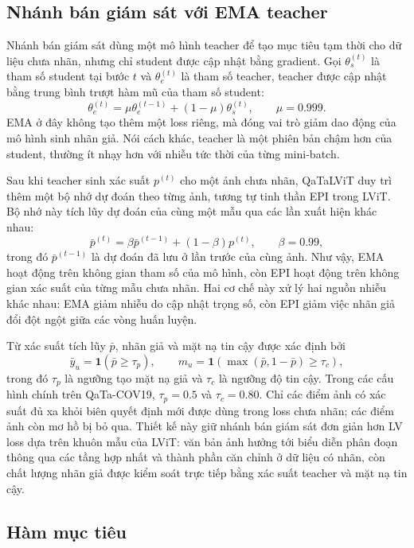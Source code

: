 \subsection{Nhánh bán giám sát với EMA teacher}

Nhánh bán giám sát dùng một mô hình teacher để tạo mục tiêu tạm thời cho dữ liệu chưa nhãn, nhưng chỉ student được cập nhật bằng gradient. Gọi \(\theta_s^{(t)}\) là tham số student tại bước \(t\) và \(\theta_e^{(t)}\) là tham số teacher, teacher được cập nhật bằng trung bình trượt hàm mũ của tham số student:
\[
\theta_e^{(t)} = \mu \theta_e^{(t-1)} + (1-\mu)\theta_s^{(t)},
\qquad \mu=0.999.
\]
EMA ở đây không tạo thêm một loss riêng, mà đóng vai trò giảm dao động của mô hình sinh nhãn giả. Nói cách khác, teacher là một phiên bản chậm hơn của student, thường ít nhạy hơn với nhiễu tức thời của từng mini-batch.

Sau khi teacher sinh xác suất \(p^{(t)}\) cho một ảnh chưa nhãn, QaTaLViT duy trì thêm một bộ nhớ dự đoán theo từng ảnh, tương tự tinh thần EPI trong LViT. Bộ nhớ này tích lũy dự đoán của cùng một mẫu qua các lần xuất hiện khác nhau:
\[
\bar{p}^{(t)} = \beta \bar{p}^{(t-1)} + (1-\beta)p^{(t)},
\qquad \beta=0.99,
\]
trong đó \(\bar{p}^{(t-1)}\) là dự đoán đã lưu ở lần trước của cùng ảnh. Như vậy, EMA hoạt động trên không gian tham số của mô hình, còn EPI hoạt động trên không gian xác suất của từng mẫu chưa nhãn. Hai cơ chế này xử lý hai nguồn nhiễu khác nhau: EMA giảm nhiễu do cập nhật trọng số, còn EPI giảm việc nhãn giả đổi đột ngột giữa các vòng huấn luyện.

Từ xác suất tích lũy \(\bar{p}\), nhãn giả và mặt nạ tin cậy được xác định bởi
\[
\bar{y}_u = \mathbf{1}(\bar{p}\ge \tau_p), \qquad
m_u = \mathbf{1}(\max(\bar{p},1-\bar{p})\ge \tau_c),
\]
trong đó \(\tau_p\) là ngưỡng tạo mặt nạ giả và \(\tau_c\) là ngưỡng độ tin cậy. Trong các cấu hình chính trên QaTa-COV19, \(\tau_p=0.5\) và \(\tau_c=0.80\). Chỉ các điểm ảnh có xác suất đủ xa khỏi biên quyết định mới được dùng trong loss chưa nhãn; các điểm ảnh còn mơ hồ bị bỏ qua. Thiết kế này giữ nhánh bán giám sát đơn giản hơn LV loss dựa trên khuôn mẫu của LViT: văn bản ảnh hưởng tới biểu diễn phân đoạn thông qua các tầng hợp nhất và thành phần căn chỉnh ở dữ liệu có nhãn, còn chất lượng nhãn giả được kiểm soát trực tiếp bằng xác suất teacher và mặt nạ tin cậy.

\subsection{Hàm mục tiêu}


